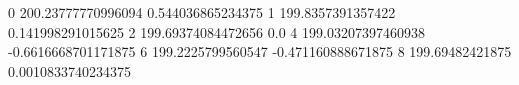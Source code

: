 0 200.23777770996094 0.544036865234375
1 199.8357391357422 0.141998291015625
2 199.69374084472656 0.0
4 199.03207397460938 -0.6616668701171875
6 199.2225799560547 -0.471160888671875
8 199.69482421875 0.0010833740234375
